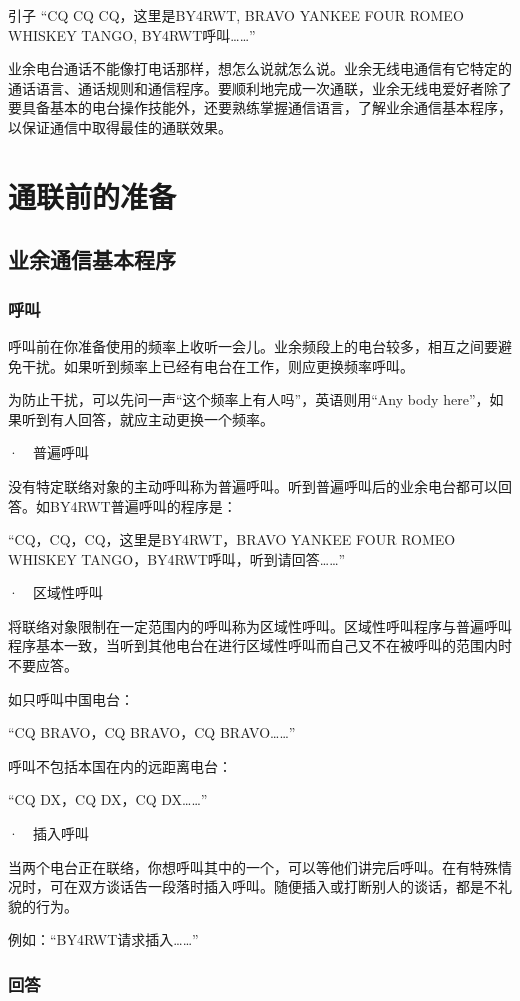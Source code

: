 \documentclass[12pt,UTF8]{ctexbook}
\begin{document}
引子
“CQ CQ CQ，这里是BY4RWT, BRAVO YANKEE FOUR ROMEO WHISKEY TANGO, BY4RWT呼叫……”

业余电台通话不能像打电话那样，想怎么说就怎么说。业余无线电通信有它特定的通话语言、通话规则和通信程序。要顺利地完成一次通联，业余无线电爱好者除了要具备基本的电台操作技能外，还要熟练掌握通信语言，了解业余通信基本程序，以保证通信中取得最佳的通联效果。

\section{通联前的准备}

\subsection{业余通信基本程序}

\subsubsection{呼叫}

呼叫前在你准备使用的频率上收听一会儿。业余频段上的电台较多，相互之间要避免干扰。如果听到频率上已经有电台在工作，则应更换频率呼叫。

为防止干扰，可以先问一声“这个频率上有人吗”，英语则用“Any body here”，如果听到有人回答，就应主动更换一个频率。

·　普遍呼叫

没有特定联络对象的主动呼叫称为普遍呼叫。听到普遍呼叫后的业余电台都可以回答。如BY4RWT普遍呼叫的程序是：

“CQ，CQ，CQ，这里是BY4RWT，BRAVO YANKEE FOUR ROMEO WHISKEY TANGO，BY4RWT呼叫，听到请回答……”

·　区域性呼叫

将联络对象限制在一定范围内的呼叫称为区域性呼叫。区域性呼叫程序与普遍呼叫程序基本一致，当听到其他电台在进行区域性呼叫而自己又不在被呼叫的范围内时不要应答。

如只呼叫中国电台：

“CQ BRAVO，CQ BRAVO，CQ BRAVO……”

呼叫不包括本国在内的远距离电台：

“CQ DX，CQ DX，CQ DX……”

·　插入呼叫

当两个电台正在联络，你想呼叫其中的一个，可以等他们讲完后呼叫。在有特殊情况时，可在双方谈话告一段落时插入呼叫。随便插入或打断别人的谈话，都是不礼貌的行为。

例如：“BY4RWT请求插入……”

\subsubsection{回答}
\end{document}
